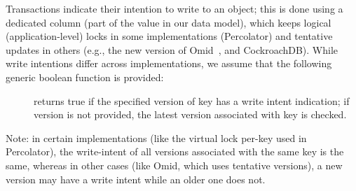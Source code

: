 Transactions indicate their intention to write to an object; this is done using
a dedicated column (part of the value in our data model), which keeps logical
(application-level) locks in some implementations (Percolator) and tentative
updates in others (e.g., the new version of Omid~\cite{omid-blog}, and CockroachDB). 
While write intentions differ across implementations, we assume that the following generic boolean function is  provided:
\begin{description}
\item[] returns true if the specified version of key has a write intent indication; if version is not provided, the 
latest version associated with key is checked.
\end{description}

Note: in certain implementations (like the virtual lock per-key used in Percolator), the write-intent of all versions associated 
with the same key is the same, whereas in other cases (like Omid, which uses tentative versions), a
new version may have a write intent while an older one does not.

